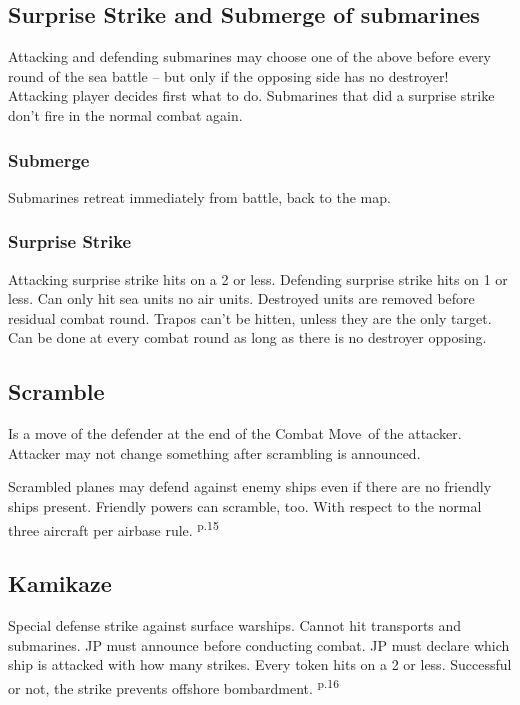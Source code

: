\documentclass[10pt,twoside]{article}
\begin{document}
\begin{multicols*}{3}
\subsection*{Surprise Strike and Submerge of submarines}
Attacking and defending submarines may choose one of the above before every round of the sea battle -- but only if the opposing side has no destroyer! Attacking player decides first what to do. Submarines that did a surprise strike don't fire in the normal combat again.

\subsubsection*{Submerge}
Submarines retreat immediately from battle, back to the map.

\subsubsection*{Surprise Strike}
Attacking surprise strike hits on a 2 or less. Defending surprise strike hits on 1 or less. Can only hit sea units no air units. Destroyed units are removed before residual combat round. Trapos can't be hitten, unless they are the only target. Can be done at every combat round as long as there is no destroyer opposing.

\subsection*{Scramble}
Is a move of the defender at the end of the \glqq Combat Move\grqq\ of the attacker. Attacker may not change something after scrambling is announced.

Scrambled planes may defend against enemy ships even if there are no friendly ships present. Friendly powers can scramble, too. With respect to the normal three aircraft per airbase rule. \textsuperscript{p.15}

\subsection*{Kamikaze}
Special defense strike against surface warships. Cannot hit transports and submarines. JP must announce before conducting combat. JP must declare which ship is attacked with how many strikes. Every token hits on a 2 or less. Successful or not, the strike prevents offshore bombardment. \textsuperscript{p.16}


\end{multicols*}
\end{document}
